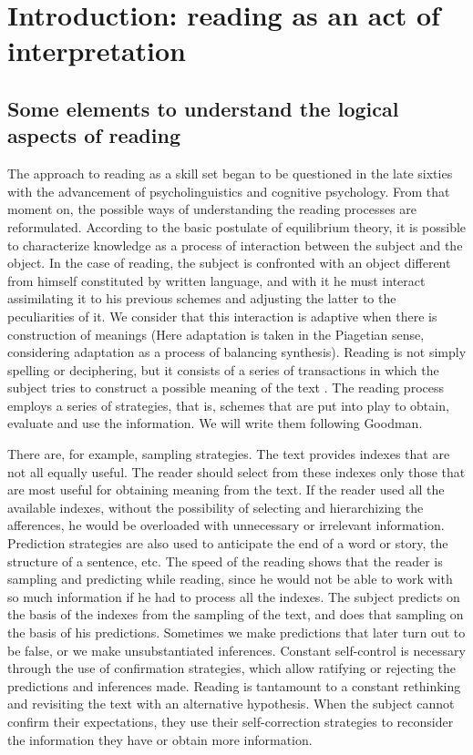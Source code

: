 \documentclass[english]{textolivre}
\begin{document}
\section{Introduction: reading as an act of interpretation}\label{sec-intro}
\subsection{Some elements to understand the logical aspects of reading}
The approach to reading as a skill set began to be questioned in the late sixties with the advancement of psycholinguistics and cognitive psychology. From that moment on, the possible ways of understanding the reading processes are reformulated. According to the basic postulate of equilibrium theory, it is possible to characterize knowledge as a process of interaction between the subject and the object. In the case of reading, the subject is confronted with an object different from himself constituted by written language, and with it he must interact assimilating it to his previous schemes and adjusting the latter to the peculiarities of it. We consider that this interaction is adaptive when there is construction of meanings (Here adaptation is taken in the Piagetian sense, considering adaptation as a process of balancing synthesis). Reading is not simply spelling or deciphering, but it consists of a series of transactions in which the subject tries to construct a possible meaning of the text \cite{goodman_proceso_1980}. The reading process employs a series of strategies, that is, schemes that are put into play to obtain, evaluate and use the information. We will write them following Goodman.

There are, for example, sampling strategies. The text provides indexes that are not all equally useful. The reader should select from these indexes only those that are most useful for obtaining meaning from the text. If the reader used all the available indexes, without the possibility of selecting and hierarchizing the afferences, he would be overloaded with unnecessary or irrelevant information. Prediction strategies are also used to anticipate the end of a word or story, the structure of a sentence, etc. The speed of the reading shows that the reader is sampling and predicting while reading, since he would not be able to work with so much information if he had to process all the indexes. The subject predicts on the basis of the indexes from the sampling of the text, and does that sampling on the basis of his predictions. Sometimes we make predictions that later turn out to be false, or we make unsubstantiated inferences. Constant self-control is necessary through the use of confirmation strategies, which allow ratifying or rejecting the predictions and inferences made. Reading is tantamount to a constant rethinking and revisiting the text with an alternative hypothesis. When the subject cannot confirm their expectations, they use their self-correction strategies to reconsider the information they have or obtain more information.
\end{document}
